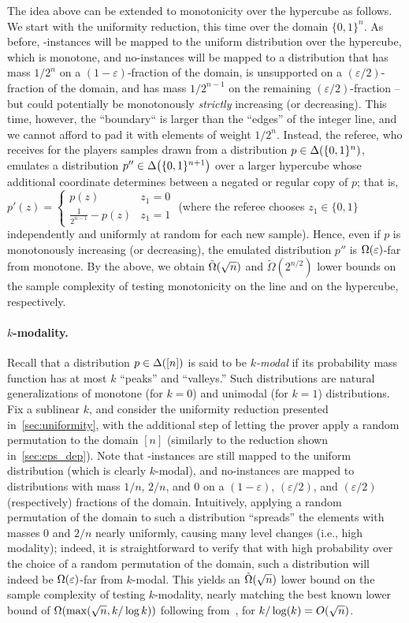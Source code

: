 \documentclass[11pt]{article}
\theoremstyle{remark}   	\newtheorem{remark}[theorem]{Remark}
\theoremstyle{definition}   	\newaliascnt{defn}{theorem}
\newcommand{\eps}{\ensuremath{\varepsilon}\xspace}
\newcommand{\no}{{\sf{}no}\xspace}
\newcommand{\bigO}[1]{{O\mleft( #1 \mright)}}
\newcommand{\bigOmega}[1]{{\Omega\mleft( #1 \mright)}}
\newcommand{\tildeOmega}[1]{\operatorname{\tilde{\Omega}}\mleft( #1 \mright)}
\newcommand{\bitset}{\ensuremath{\{0,1\}}}
\begin{document}
 The idea above can be extended to monotonicity over the hypercube as follows. We start with the uniformity reduction, this time over the domain $\bitset^n$. As before, \yes-instances will be mapped to the uniform distribution over the hypercube, which is monotone, and \no-instances will be mapped to a distribution that has mass $1/2^n$ on a $(1-\eps)$-fraction of the domain, is unsupported on a $(\eps/2)$-fraction of the domain, and has mass $1/2^{n-1}$ on the remaining $(\eps/2)$-fraction -- but could potentially be monotonously \emph{strictly} increasing (or decreasing). This time, however, the ``boundary`` is larger than the ``edges'' of the integer line, and we cannot afford to pad it with elements of weight $1/2^n$. Instead, the referee, who receives for the players samples drawn from a distribution $p\in\distribs{\bitset^n}$, emulates a distribution $p''\in\distribs{\bitset^{n+1}}$ over a larger hypercube whose additional coordinate determines between a negated or regular copy of $p$; that is, 
 $p'(z) = 
 \begin{cases}
	p(z) & z_1 = 0 \\
  \frac{1}{2^{n-1}} -p(z) & z_1 = 1
 \end{cases}$ (where the referee chooses $z_1\in\{0,1\}$ independently and uniformly at random for each new sample). Hence, even if $p$ is monotonously increasing (or decreasing), the emulated distribution $p''$ is $\bigOmega{\eps}$-far from monotone.
 By the above, we obtain $\tildeOmega{\sqrt{n}}$ and $\tilde{\Omega}(2^{n/2})$ lower bounds on the sample complexity of testing monotonicity on the line and on the hypercube, respectively.
 

\paragraph{$k$-modality.} Recall that a distribution $p\in\Delta\!\left([n]\right)$ is said to be \emph{$k$-modal} if its probability mass function has at most $k$ ``peaks'' and ``valleys.'' Such distributions are natural generalizations of monotone (for $k = 0$) and unimodal (for $k = 1$) distributions. Fix a sublinear $k$, and consider the uniformity reduction presented in~\autoref{sec:uniformity}, with the additional step of letting the prover apply a random permutation to the domain $[n]$ (similarly to the reduction shown in~\autoref{sec:eps_dep}). Note that \yes-instances are still mapped to the uniform distribution (which is clearly $k$-modal), and \no-instances are mapped to distributions with mass $1/n$, $2/n$, and $0$ on a $(1-\eps)$, $(\eps/2)$, and $(\eps/2)$ (respectively) fractions of the domain. Intuitively, applying a random permutation of the domain to such a distribution ``spreads'' the elements with masses $0$ and $2/n$ nearly uniformly, causing many level changes (i.e., high modality); indeed, it is straightforward to verify that with high probability over the choice of a random permutation of the domain, such a distribution will indeed be $\bigOmega{\eps}$-far from $k$-modal. This yields an $\tildeOmega{\sqrt{n}}$ lower bound on the sample complexity of testing $k$-modality, nearly matching the best known lower bound of $\bigOmega{\max( \sqrt{n}, k/\log k)}$ following from~\cite{Canonne:16}, for $k/\log(k) = \bigO{\sqrt{n}}$.
\end{document}
